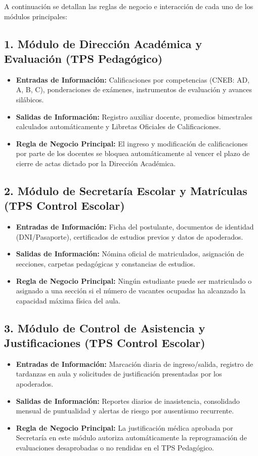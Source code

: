 \documentclass[12pt,a4paper,oneside]{report}
\begin{document}
    A continuación se detallan las reglas de negocio e interacción de cada uno de los módulos principales:

    \subsection{1. Módulo de Dirección Académica y Evaluación (TPS Pedagógico)}
    \begin{itemize}
        \item \textbf{Entradas de Información:} Calificaciones por competencias (CNEB: AD, A, B, C), ponderaciones de exámenes, instrumentos de evaluación y avances silábicos.
        \item \textbf{Salidas de Información:} Registro auxiliar docente, promedios bimestrales calculados automáticamente y Libretas Oficiales de Calificaciones.
        \item \textbf{Regla de Negocio Principal:} El ingreso y modificación de calificaciones por parte de los docentes se bloquea automáticamente al vencer el plazo de cierre de actas dictado por la Dirección Académica.
    \end{itemize}

    \subsection{2. Módulo de Secretaría Escolar y Matrículas (TPS Control Escolar)}
    \begin{itemize}
        \item \textbf{Entradas de Información:} Ficha del postulante, documentos de identidad (DNI/Pasaporte), certificados de estudios previos y datos de apoderados.
        \item \textbf{Salidas de Información:} Nómina oficial de matriculados, asignación de secciones, carpetas pedagógicas y constancias de estudios.
        \item \textbf{Regla de Negocio Principal:} Ningún estudiante puede ser matriculado o asignado a una sección si el número de vacantes ocupadas ha alcanzado la capacidad máxima física del aula.
    \end{itemize}

    \subsection{3. Módulo de Control de Asistencia y Justificaciones (TPS Control Escolar)}
    \begin{itemize}
        \item \textbf{Entradas de Información:} Marcación diaria de ingreso/salida, registro de tardanzas en aula y solicitudes de justificación presentadas por los apoderados.
        \item \textbf{Salidas de Información:} Reportes diarios de inasistencia, consolidado mensual de puntualidad y alertas de riesgo por ausentismo recurrente.
        \item \textbf{Regla de Negocio Principal:} La justificación médica aprobada por Secretaría en este módulo autoriza automáticamente la reprogramación de evaluaciones desaprobadas o no rendidas en el TPS Pedagógico.
    \end{itemize}
\end{document}
